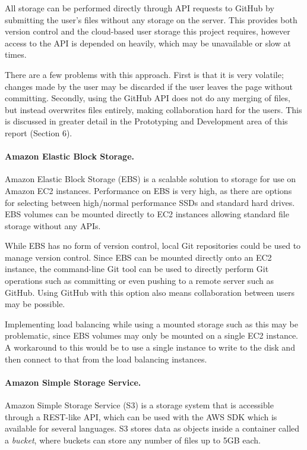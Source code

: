 All storage can be performed directly through API requests to GitHub by submitting the user's files without any storage on the server.\cite{githubapicommit} This provides both version control and the cloud-based user storage this project requires, however access to the API is depended on heavily, which may be unavailable or slow at times.

There are a few problems with this approach. First is that it is very volatile; changes made by the user may be discarded if the user leaves the page without committing. Secondly, using the GitHub API does not do any merging of files, but instead overwrites files entirely, making collaboration hard for the users. This is discussed in greater detail in the Prototyping and Development area of this report (Section 6).

\paragraph{Amazon Elastic Block Storage.}
Amazon Elastic Block Storage (EBS) is a scalable solution to storage for use on Amazon EC2 instances. Performance on EBS is very high, as there are options for selecting between high/normal performance SSDs and standard hard drives. EBS volumes can be mounted directly to EC2 instances allowing standard file storage without any APIs.\cite{awsebs}

While EBS has no form of version control, local Git repositories could be used to manage version control. Since EBS can be mounted directly onto an EC2 instance, the command-line Git tool can be used to directly perform Git operations such as committing or even pushing to a remote server such as GitHub. Using GitHub with this option also means collaboration between users may be possible.

Implementing load balancing while using a mounted storage such as this may be problematic, since EBS volumes may only be mounted on a single EC2 instance. A workaround to this would be to use a single instance to write to the disk and then connect to that from the load balancing instances.

\paragraph{Amazon Simple Storage Service.}
Amazon Simple Storage Service (S3) is a storage system that is accessible through a REST-like API, which can be used with the AWS SDK which is available for several languages.\cite{awss3} S3 stores data as objects inside a container called a \emph{bucket}, where buckets can store any number of files up to 5GB each.

